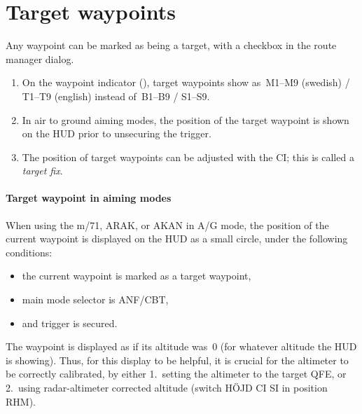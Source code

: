 \section{Target waypoints}\label{sec:target-wpt}
Any waypoint can be marked as being a target, with a checkbox in the route manager dialog.
\begin{enumerate}
  \item On the waypoint indicator (),
    target waypoints show as~M1--M9 (swedish) / T1--T9 (english) instead of~B1--B9 / S1--S9.
  \item In air to ground aiming modes, the position of the target waypoint
    is shown on the HUD prior to unsecuring the trigger.
  \item The position of target waypoints can be adjusted with the CI;
    this is called a \emph{target fix}.
\end{enumerate}

\paragraph{Target waypoint in aiming modes}
When using the m/71, ARAK, or AKAN in A/G mode,
the position of the current waypoint is displayed on the HUD as a small circle, under the following conditions:
\begin{itemize}[noitemsep]
  \item the current waypoint is marked as a target waypoint,
  \item main mode selector is ANF/CBT,
  \item and trigger is secured.
\end{itemize}
The waypoint is displayed as if its altitude was~0 (for whatever altitude the HUD is showing).
Thus, for this display to be helpful, it is crucial for the altimeter to be correctly calibrated,
by either 1.\ setting the altimeter to the target QFE,
or 2.\ using radar-altimeter corrected altitude (switch HÖJD CI SI in position RHM).


